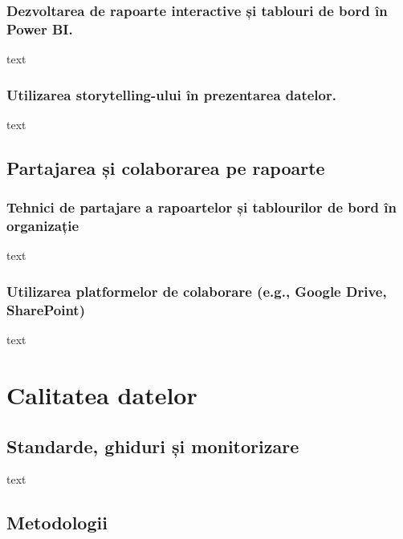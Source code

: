 \documentclass[
  11pt,
  b5paper,
  nottoc]{book}
\begin{document}
\subsection{Dezvoltarea de rapoarte interactive și tablouri de bord în
Power
BI.}\label{dezvoltarea-de-rapoarte-interactive-ux219i-tablouri-de-bord-uxeen-power-bi.}

text

\subsection{Utilizarea storytelling-ului în prezentarea
datelor.}\label{utilizarea-storytelling-ului-uxeen-prezentarea-datelor.}

text

\section{Partajarea și colaborarea pe
rapoarte}\label{partajarea-ux219i-colaborarea-pe-rapoarte}

\subsection{Tehnici de partajare a rapoartelor și tablourilor de bord în
organizație}\label{tehnici-de-partajare-a-rapoartelor-ux219i-tablourilor-de-bord-uxeen-organizaux21bie}

text

\subsection{Utilizarea platformelor de colaborare (e.g., Google Drive,
SharePoint)}\label{utilizarea-platformelor-de-colaborare-e.g.-google-drive-sharepoint}

text


\chapter{Calitatea datelor}\label{cap9}

\section{Standarde, ghiduri și
monitorizare}\label{standarde-ghiduri-ux219i-monitorizare}

text

\section{Metodologii}\label{metodologii}
\end{document}
